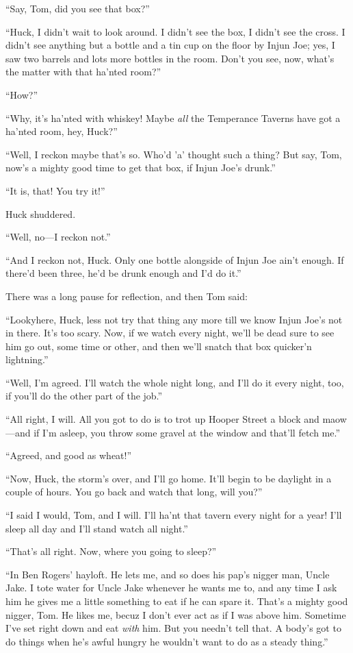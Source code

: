 \documentclass{book}
\begin{document}
“Say, Tom, did you see that box?”

“Huck, I didn’t wait to look around. I didn’t see the box, I didn’t see the cross. I didn’t see anything but a bottle and a tin cup on the floor by Injun Joe; yes, I saw two barrels and lots more bottles in the room. Don’t you see, now, what’s the matter with that ha’nted room?”

“How?”

“Why, it’s ha’nted with whiskey! Maybe \emph{all} the Temperance Taverns have got a ha’nted room, hey, Huck?”

“Well, I reckon maybe that’s so. Who’d ’a’ thought such a thing? But say, Tom, now’s a mighty good time to get that box, if Injun Joe’s drunk.”

“It is, that! You try it!”

Huck shuddered.

“Well, no—I reckon not.”

“And I reckon not, Huck. Only one bottle alongside of Injun Joe ain’t enough. If there’d been three, he’d be drunk enough and I’d do it.”

There was a long pause for reflection, and then Tom said:

“Lookyhere, Huck, less not try that thing any more till we know Injun Joe’s not in there. It’s too scary. Now, if we watch every night, we’ll be dead sure to see him go out, some time or other, and then we’ll snatch that box quicker’n lightning.”

“Well, I’m agreed. I’ll watch the whole night long, and I’ll do it every night, too, if you’ll do the other part of the job.”

“All right, I will. All you got to do is to trot up Hooper Street a block and maow—and if I’m asleep, you throw some gravel at the window and that’ll fetch me.”

“Agreed, and good as wheat!”

“Now, Huck, the storm’s over, and I’ll go home. It’ll begin to be daylight in a couple of hours. You go back and watch that long, will you?”

“I said I would, Tom, and I will. I’ll ha’nt that tavern every night for a year! I’ll sleep all day and I’ll stand watch all night.”

“That’s all right. Now, where you going to sleep?”

“In Ben Rogers’ hayloft. He lets me, and so does his pap’s nigger man, Uncle Jake. I tote water for Uncle Jake whenever he wants me to, and any time I ask him he gives me a little something to eat if he can spare it. That’s a mighty good nigger, Tom. He likes me, becuz I don’t ever act as if I was above him. Sometime I’ve set right down and eat \emph{with} him. But you needn’t tell that. A body’s got to do things when he’s awful hungry he wouldn’t want to do as a steady thing.”
\end{document}
